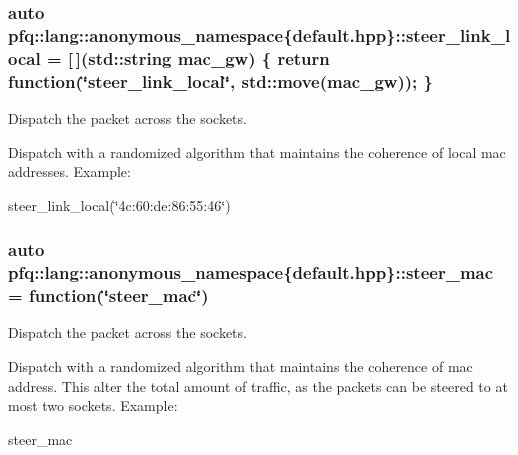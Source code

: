 \subsubsection[{\texorpdfstring{steer\+\_\+link\+\_\+local}{steer_link_local}}]{\setlength{\rightskip}{0pt plus 5cm}auto pfq\+::lang\+::anonymous\+\_\+namespace\{default.\+hpp\}\+::steer\+\_\+link\+\_\+local = \mbox{[}$\,$\mbox{]}(std\+::string mac\+\_\+gw) \{ return {\bf function}(\char`\"{}steer\+\_\+link\+\_\+local\char`\"{}, std\+::move(mac\+\_\+gw)); \}}\hypertarget{namespacepfq_1_1lang_1_1anonymous__namespace_02default_8hpp_03_a6bcbd11933d00917b62ef72890a98c3c}{}\label{namespacepfq_1_1lang_1_1anonymous__namespace_02default_8hpp_03_a6bcbd11933d00917b62ef72890a98c3c}


Dispatch the packet across the sockets. 

Dispatch with a randomized algorithm that maintains the coherence of local mac addresses. Example\+:

steer\+\_\+link\+\_\+local(\char`\"{}4c\+:60\+:de\+:86\+:55\+:46\char`\"{}) 
\subsubsection[{\texorpdfstring{steer\+\_\+mac}{steer_mac}}]{\setlength{\rightskip}{0pt plus 5cm}auto pfq\+::lang\+::anonymous\+\_\+namespace\{default.\+hpp\}\+::steer\+\_\+mac = {\bf function}(\char`\"{}steer\+\_\+mac\char`\"{})}\hypertarget{namespacepfq_1_1lang_1_1anonymous__namespace_02default_8hpp_03_ad51e91e3b485c729ac1ba39a46e337a0}{}\label{namespacepfq_1_1lang_1_1anonymous__namespace_02default_8hpp_03_ad51e91e3b485c729ac1ba39a46e337a0}


Dispatch the packet across the sockets. 

Dispatch with a randomized algorithm that maintains the coherence of mac address. This alter the total amount of traffic, as the packets can be steered to at most two sockets. Example\+:

steer\+\_\+mac 
